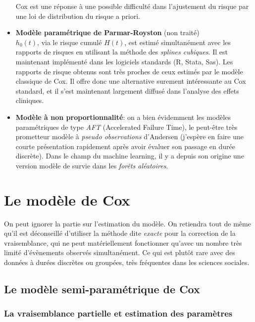 \documentclass[
  12pt,
  letterpaper,
  DIV=11,
  numbers=noendperiod,
  onepage,
  openany]{scrreprt}
\begin{document}
\begin{itemize}
  Cox est une réponse à une possible difficulté dans l'ajustement du
  risque par une loi de distribution du risque a priori.
\item
  \textbf{Modèle paramétrique de Parmar-Royston} (non traité)\\
  \(h_0(t)\), via le risque cumulé \(H(t)\), est estimé simultanément
  avec les rapports de risques en utilisant la méthode des \emph{splines
  cubiques}. Il est maintenant implémenté dans les logiciels standards
  (R, Stata, Sas). Les rapports de risque obtenus sont très proches de
  ceux estimés par le modèle classique de Cox. Il offre donc une
  alternative surement intéressante au Cox standard, et il s'est
  maintenant largement diffusé dans l'analyse des effets cliniques.
\item
  \textbf{Modèle à non proportionnalité}: on a bien évidemment les
  modèles paramétriques de type \emph{AFT} (Accelerated Failure Time),
  le peut-être très prometteur modèle à \emph{pseudo observations}
  d'Andersen (j'espère en faire une courte présentation rapidement après
  avoir évaluer son passage en durée discrète). Dans le champ du machine
  learning, il y a depuis son origine une version modèle de survie dans
  les \emph{forêts aléatoires}.
\end{itemize}

\hypertarget{le-moduxe8le-de-cox}{%
\chapter{\texorpdfstring{\textbf{Le modèle de
Cox}}{Le modèle de Cox}}\label{le-moduxe8le-de-cox}}

On peut ignorer la partie sur l'estimation du modèle. On retiendra tout
de même qu'il est déconseillé d'utiliser la méthode dite \emph{exacte}
pour la correction de la vraisemblance, qui ne peut matériellement
fonctionner qu'avec un nombre très limité d'évènements observés
simultanément. Ce qui est plutôt rare avec des données à durées
discrètes ou groupées, très fréquentes dans les sciences sociales.

\hypertarget{le-moduxe8le-semi-paramuxe9trique-de-cox}{%
\section{Le modèle semi-paramétrique de
Cox}\label{le-moduxe8le-semi-paramuxe9trique-de-cox}}

\hypertarget{la-vraisemblance-partielle-et-estimation-des-paramuxe8tres}{%
\subsection{La vraisemblance partielle et estimation des
paramètres}\label{la-vraisemblance-partielle-et-estimation-des-paramuxe8tres}}
\end{document}
